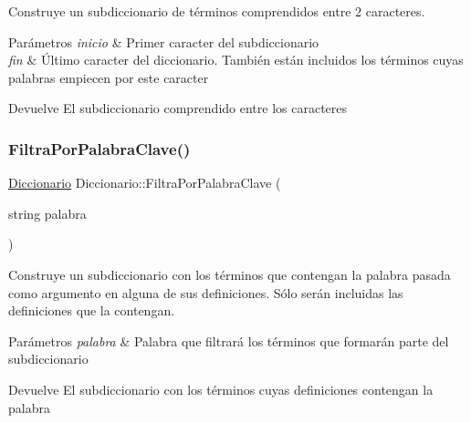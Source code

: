 Construye un subdiccionario de términos comprendidos entre 2 caracteres. 


\begin{DoxyParams}{Parámetros}
{\em inicio} & Primer caracter del subdiccionario \\
\hline
{\em fin} & Último caracter del diccionario. También están incluidos los términos cuyas palabras empiecen por este caracter \\
\hline
\end{DoxyParams}
\begin{DoxyReturn}{Devuelve}
El subdiccionario comprendido entre los caracteres 
\end{DoxyReturn}
\mbox{\label{classDiccionario_a20b621eb60d2e7dda2175b543484f6b2}} 
\subsubsection{\texorpdfstring{Filtra\+Por\+Palabra\+Clave()}{FiltraPorPalabraClave()}}
{\footnotesize\ttfamily \hyperlink{classDiccionario}{Diccionario} Diccionario\+::\+Filtra\+Por\+Palabra\+Clave (\begin{DoxyParamCaption}\item[{string}]{palabra }\end{DoxyParamCaption})}



Construye un subdiccionario con los términos que contengan la palabra pasada como argumento en alguna de sus definiciones. Sólo serán incluidas las definiciones que la contengan. 


\begin{DoxyParams}{Parámetros}
{\em palabra} & Palabra que filtrará los términos que formarán parte del subdiccionario \\
\hline
\end{DoxyParams}
\begin{DoxyReturn}{Devuelve}
El subdiccionario con los términos cuyas definiciones contengan la palabra 
\end{DoxyReturn}
\mbox{\label{classDiccionario_af57dab936ac05b29da85d9939b5cfaa6}} 
